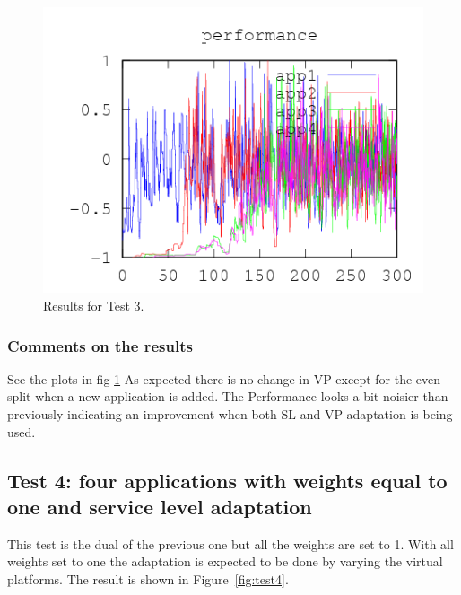 \documentclass[nobiblatex]{LTHthesis}
\begin{document}
\begin{figure}[th]
\begin{minipage}{0.49\textwidth}
  \includegraphics[width=\textwidth]{"tools/plot/logs/test3/f"}
  \end{minipage}
\caption{Results for Test 3.}
\label{fig:test3}
\end{figure}

\subsubsection{Comments on the results}
See the plots in fig \ref{fig:test3}
As expected there is no change in VP except for the even split when a new application is added. The Performance looks a bit noisier than previously indicating an improvement when both SL and VP adaptation is being used.

\subsection{Test 4: four applications with weights equal to one and 
  service level adaptation}

This test is the dual of the previous one but all the weights are set to 1.
With all weights set to one the adaptation is expected to be done by varying the virtual platforms. The result is shown in Figure~\ref{fig:test4}. 
\end{document}

